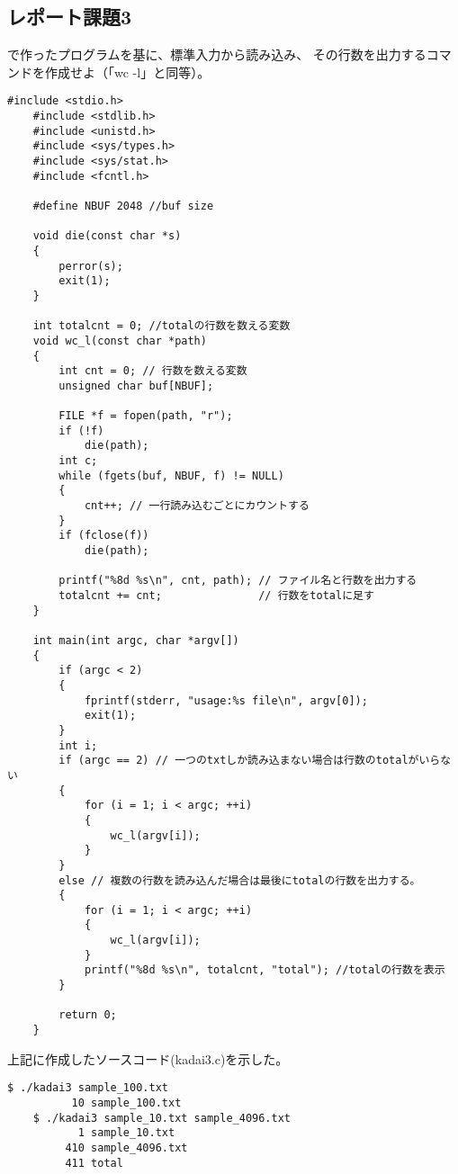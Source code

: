 \documentclass[12pt]{jarticle}
\begin{document}
\subsection{レポート課題3}
\begin{shadebox}
    で作ったプログラムを基に、標準入力から読み込み、
    その行数を出力するコマンドを作成せよ（「wc -l」と同等）。
\end{shadebox}
\begin{lstlisting}[caption=kadai3.c,label=kadai3, style=lstC]
    #include <stdio.h>
    #include <stdlib.h>
    #include <unistd.h>
    #include <sys/types.h>
    #include <sys/stat.h>
    #include <fcntl.h>
    
    #define NBUF 2048 //buf size
    
    void die(const char *s)
    {
        perror(s);
        exit(1);
    }
    
    int totalcnt = 0; //totalの行数を数える変数
    void wc_l(const char *path)
    {
        int cnt = 0; // 行数を数える変数
        unsigned char buf[NBUF];
    
        FILE *f = fopen(path, "r");
        if (!f)
            die(path);
        int c;
        while (fgets(buf, NBUF, f) != NULL)
        {
            cnt++; // 一行読み込むごとにカウントする
        }
        if (fclose(f))
            die(path);
    
        printf("%8d %s\n", cnt, path); // ファイル名と行数を出力する
        totalcnt += cnt;               // 行数をtotalに足す
    }
    
    int main(int argc, char *argv[])
    {
        if (argc < 2)
        {
            fprintf(stderr, "usage:%s file\n", argv[0]);
            exit(1);
        }
        int i;
        if (argc == 2) // 一つのtxtしか読み込まない場合は行数のtotalがいらない
        {
            for (i = 1; i < argc; ++i)
            {
                wc_l(argv[i]);
            }
        }
        else // 複数の行数を読み込んだ場合は最後にtotalの行数を出力する。
        {
            for (i = 1; i < argc; ++i)
            {
                wc_l(argv[i]);
            }
            printf("%8d %s\n", totalcnt, "total"); //totalの行数を表示
        }
    
        return 0;
    }
\end{lstlisting}

上記に作成したソースコード(kadai3.c)を示した。
\begin{lstlisting}[style = lstbash]
    $ ./kadai3 sample_100.txt
          10 sample_100.txt
    $ ./kadai3 sample_10.txt sample_4096.txt
           1 sample_10.txt
         410 sample_4096.txt
         411 total
\end{lstlisting}
\end{document}
